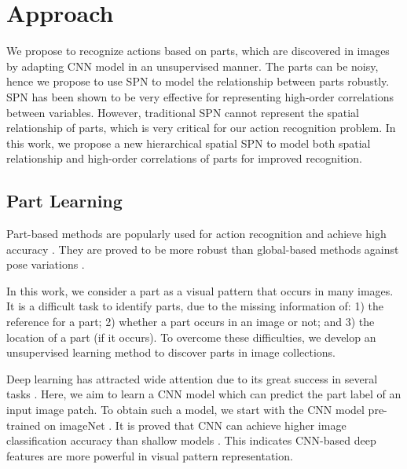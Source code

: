 \documentclass[journal]{IEEEtran}
\begin{document}
\section{Approach}
\label{Sec:Approach}


We propose to recognize actions based on parts, which are discovered in images by adapting CNN model in an unsupervised manner. The parts can be noisy, hence we propose to use SPN to model the relationship between parts robustly.
SPN \cite{poon2011SPNIntroduce} has been shown to be very effective for representing high-order correlations between variables. However, traditional SPN cannot represent the spatial relationship of parts, which is very critical for our action recognition problem. In this work, we propose a new hierarchical spatial SPN to model both spatial relationship and high-order correlations of parts for improved recognition.



\subsection{Part Learning}
\label{section_part_learning}

Part-based methods \cite{liuting} are popularly used for action recognition and achieve high accuracy \cite{YangWMCVPR10,MajiActionCVPR11,YiYangCVPR2011:APE:2191740.2192012,Yao11humanaction__Stanford40,sharma:CVPR2013,Shahroudy2015Multimodal}.
They are proved to be more robust than global-based methods against pose variations \cite{YangWMCVPR10,FelzenszwalbMR_CVPR_2008}.


In this work, we consider a part as a visual pattern that occurs in many images. It is a difficult task to identify parts, due to the missing information of: 1) the reference for a part; 2) whether a part occurs in an image or not; and 3) the location of a part (if it occurs). To overcome these difficulties, we develop an unsupervised learning method to discover parts in image collections.


Deep learning has attracted wide attention due to its great success in several tasks \cite{Zuo2015Learning,Shuai2016Scene}. Here, we aim to learn a CNN model which can predict the part label of an input image patch.
To obtain such a model, we start with the CNN model pre-trained on imageNet \cite{CNN__NIPS2012_4824,jia2014caffe}. It is proved that CNN can achieve higher image classification accuracy than shallow models \cite{CNN__NIPS2012_4824}. This indicates CNN-based deep features are more powerful in visual pattern representation.  
\end{document}
